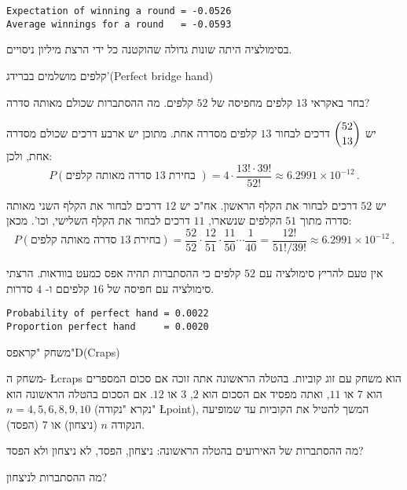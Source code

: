 \sml{}
\begin{verbatim}
Expectation of winning a round = -0.0526
Average winnings for a round   = -0.0593
\end{verbatim}
בסימולציה היתה שונות גדולה שהוקטנה כל ידי הרצת מיליון ניסויים.


\begin{prob}{קלפים מושלמים בברידג'}{}{(Perfect bridge hand)}

בחר באקראי 
$13$
קלפים מחפיסה של 
$52$
קלפים. מה ההסתברות שכולם מאותה סדרה?
\end{prob}


יש
$\displaystyle{52 \choose 13}$
דרכים לבחור 
$13$
קלפים מסדרה אחת. מתוכן יש ארבע דרכים שכולם מסדרה אחת, ולכן:
\[
P(\textrm{סדרה מאותה קלפים}\;13\;\textrm{בחירת })=4\cdot \frac{13! \cdot 39!}{52!}\approx 6.2991\times 10^{-12}\,.
\]


יש 
$52$
דרכים לבחור את הקלף הראשון. אח"כ יש 
$12$
דרכים לבחור את הקלף השני מאותה סדרה מתוך 
$51$
הקלפים שנשארו,
$11$
דרכים לבחור את הקלף השלישי, וכו'. מכאן:
\[
P(\textrm{סדרה מאותה קלפים}\;13\;\textrm{בחירת})=\frac{52}{52}\cdot \frac{12}{51}\cdot \frac{11}{50} \cdots  \frac{1}{40}= \frac{12!}{51!/39!}\approx 6.2991\times 10^{-12}\,.
\]

\sml{}

אין טעם להריץ סימולציה עם 
$52$
קלפים כי ההסתברות תהיה אפס כמעט בוודאות. הרצתי סימולציה עם חפיסה של 
$16$
קלפיםם ו-%
$4$
סדרות.
\begin{verbatim}
Probability of perfect hand = 0.0022
Proportion perfect hand     = 0.0020
\end{verbatim}


\begin{prob}{משחק "קראפס"}{D}{(Craps)}

משחק ה-%
\L{craps}
הוא משחק עם זוג קוביות. בהטלה הראשונה אתה זוכה אם סכום המספרים הוא
$7$
או
$11$,
ואתה מפסיד אם הסכום הוא
$2$, $3$
או
$12$.
אם הסכום בהטלה הראשונה הוא
$n=4,5,6,8,9,10$ 
(נקרא "נקודה" 
\L{point}),
המשך להטיל את הקוביות עד שמופיעה הנקודה 
$n$
(ניצחון) או 
$7$
(הפסד).

מה ההסתברות של האירועים בהטלה הראשונה: ניצחון, הפסד, לא ניצחון ולא הפסד?

מה ההסתברות לניצחון?
\end{prob}

